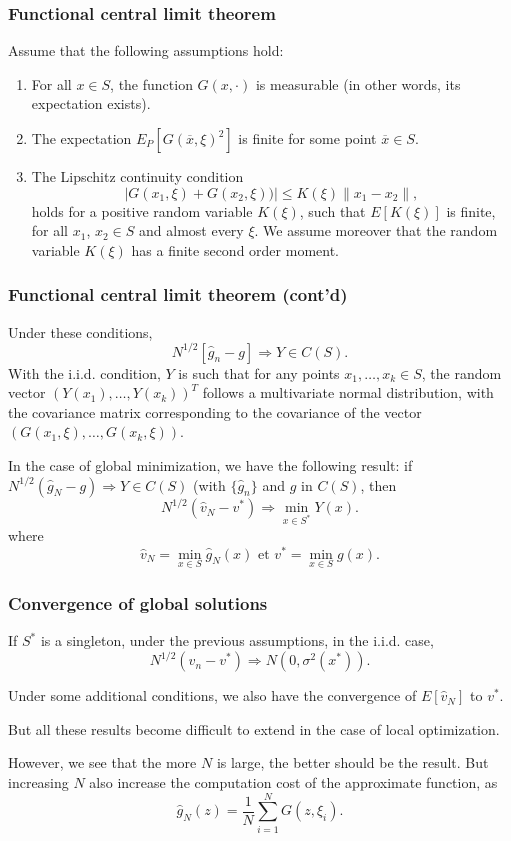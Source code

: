 \documentclass{beamer}
\begin{document}
\begin{frame}
\frametitle{Functional central limit theorem}

Assume that the following assumptions hold:
\begin{enumerate}
\item
For all $x \in S$, the function $G(x,\cdot)$ is measurable (in other words, its expectation exists).
\item
The expectation $E_P[G(\overline{x}, \xi)^2]$ is finite for some point $\overline{x} \in S$.
\item
The Lipschitz continuity condition
\[
| G(x_1, \xi) + G(x_2, \xi) )| \leq K(\xi) \| x_1 - x_2\|,
\]
holds for a positive random variable $K(\xi)$, such that $E[K(\xi)]$ is finite, for all $x_1$, $x_2 \in S$ and almost every $\xi$.
We assume moreover that the random variable $K(\xi)$ has a finite second order moment.
\end{enumerate}

\end{frame}

\begin{frame}
\frametitle{Functional central limit theorem (cont'd)}

Under these conditions,
\[
N^{1/2} [\hat{g}_n - g] \Rightarrow Y \in C(S).
\]
With the i.i.d. condition, $Y$ is such that for any points $x_1,\ldots,x_k \in S$, the random vector $(Y(x_1),\ldots,Y(x_k))^T$ follows a multivariate normal distribution, with the covariance matrix corresponding to the covariance of the vector $(G(x_1, \xi), \ldots, G(x_k, \xi))$.

\mbox{}

In the case of global minimization, we have the following result: if $N^{1/2}(\hat{g}_N - g) \Rightarrow Y \in C(S)$ (with $\lbrace \hat{g}_n \rbrace$ and $g$ in $C(S)$, then
\[
N^{1/2}(\hat{v}_N - v^*) \Rightarrow \min_{x \in S^*} Y(x).
\]
where
\[
\hat{v}_N = \min_{x \in S} \hat{g}_N(x) \mbox{ et } v^*= \min_{x \in S} g(x).
\]

\end{frame}

\begin{frame}
\frametitle{Convergence of global solutions}

If $S^*$ is a singleton, under the previous assumptions, in the i.i.d. case,
\[
N^{1/2}(\hat{v}_n - v^*) \Rightarrow N(0, \sigma^2(x^*) ).
\]

\mbox{}

Under some additional conditions, we also have the convergence of $E[\hat{v}_N]$ to $v^*$.

\mbox{}

But all these results become difficult to extend in the case of local optimization.

\mbox{}

However, we see that the more $N$ is large, the better should be the result.
But increasing $N$ also increase the computation cost of the approximate function, as\[
\hat{g}_N(z) = \frac{1}{N} \sum_{i = 1}^N G (z, \xi_i).
\]

\end{frame}
\end{document}
